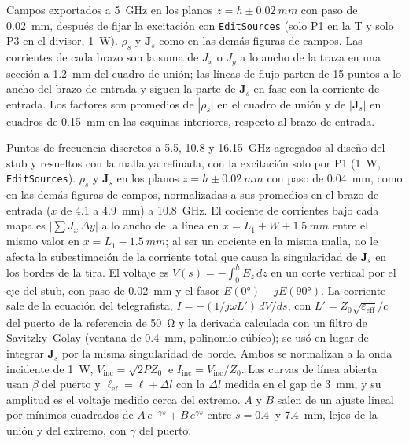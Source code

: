 \documentclass[11pt,letterpaper]{article}
\begin{document}
\begin{description}[style=nextline,leftmargin=0pt,itemsep=4pt,font=\normalfont\bfseries]
\item[Figura~\ref{fig:d5campos} (campos de la T)] Campos exportados a \SI{5}{GHz} en los planos $z=h\pm\SI{0.02}{mm}$ con paso de \SI{0.02}{mm}, después de fijar la excitación con \texttt{EditSources} (solo P1 en la T y solo P3 en el divisor, \SI{1}{W}). $\rho_s$ y $\mathbf{J}_s$ como en las demás figuras de campos. Las corrientes de cada brazo son la suma de $J_x$ o $J_y$ a lo ancho de la traza en una sección a \SI{1.2}{mm} del cuadro de unión; las líneas de flujo parten de 15 puntos a lo ancho del brazo de entrada y siguen la parte de $\mathbf{J}_s$ en fase con la corriente de entrada. Los factores son promedios de $|\rho_s|$ en el cuadro de unión y de $|\mathbf{J}_s|$ en cuadros de \SI{0.15}{mm} en las esquinas interiores, respecto al brazo de entrada.

\item[Figuras~\ref{fig:d5stubmapas} y~\ref{fig:d5stubonda} (campos del stub)] Puntos de frecuencia discretos a \SI{5.5}{}, \SI{10.8}{} y \SI{16.15}{GHz} agregados al diseño del stub y resueltos con la malla ya refinada, con la excitación solo por P1 (\SI{1}{W}, \texttt{EditSources}). $\rho_s$ y $\mathbf{J}_s$ en los planos $z=h\pm\SI{0.02}{mm}$ con paso de \SI{0.04}{mm}, como en las demás figuras de campos, normalizadas a sus promedios en el brazo de entrada ($x$ de \SI{4.1}{} a \SI{4.9}{mm}) a \SI{10.8}{GHz}. El cociente de corrientes bajo cada mapa es $|\sum J_x\,\Delta y|$ a lo ancho de la línea en $x=L_1+W+\SI{1.5}{mm}$ entre el mismo valor en $x=L_1-\SI{1.5}{mm}$; al ser un cociente en la misma malla, no le afecta la subestimación de la corriente total que causa la singularidad de $\mathbf{J}_s$ en los bordes de la tira. El voltaje es $V(s)=-\int_0^h E_z\,dz$ en un corte vertical por el eje del stub, con paso de \SI{0.02}{mm} y el fasor $E(\ang{0})-jE(\ang{90})$. La corriente sale de la ecuación del telegrafista, $I=-(1/j\omega L')\,dV/ds$, con $L'=Z_0\sqrt{\varepsilon_{\mathrm{eff}}}/c$ del puerto de la referencia de \SI{50}{\ohm} y la derivada calculada con un filtro de Savitzky--Golay (ventana de \SI{0.4}{mm}, polinomio cúbico); se usó en lugar de integrar $\mathbf{J}_s$ por la misma singularidad de borde. Ambos se normalizan a la onda incidente de \SI{1}{W}, $V_{\mathrm{inc}}=\sqrt{2PZ_0}$ e $I_{\mathrm{inc}}=V_{\mathrm{inc}}/Z_0$. Las curvas de línea abierta usan $\beta$ del puerto y $\ell_{\mathrm{ef}}=\ell+\Delta l$ con la $\Delta l$ medida en el gap de \SI{3}{mm}, y su amplitud es el voltaje medido cerca del extremo. $A$ y $B$ salen de un ajuste lineal por mínimos cuadrados de $A\,e^{-\gamma s}+B\,e^{\gamma s}$ entre $s=\SI{0.4}{}$ y \SI{7.4}{mm}, lejos de la unión y del extremo, con $\gamma$ del puerto.
\end{description}
\end{document}
